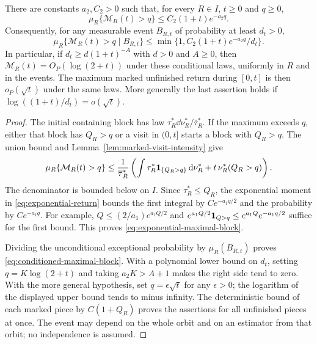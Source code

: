 \begin{theorem}
\label{thm:conditioned-maximal-block}
There are constants $a_2,C_2>0$ such that, for every $R\in I$, $t\ge0$
and $q\ge0$,
\begin{equation}\label{eq:exponential-maximal-block}
 \mu_R\{\mathcal M_R(t)>q\}\le C_2(1+t)e^{-a_2q}.
\end{equation}
Consequently, for any measurable event $B_{R,t}$ of probability at least
$d_t>0$,
\begin{equation}\label{eq:conditioned-maximal-block}
 \mu_R\{\mathcal M_R(t)>q\mid B_{R,t}\}
       \le\min\{1,C_2(1+t)e^{-a_2q}/d_t\}.
\end{equation}
In particular, if $d_t\ge d(1+t)^{-A}$ with $d>0$ and $A\ge0$, then
$\mathcal M_R(t)=O_P(\log(2+t))$ under these conditional laws, uniformly
in $R$ and in the events. The maximum marked unfinished return during
$[0,t]$ is then $o_P(\sqrt t)$ under the same laws. More generally the
last assertion holds if $\log((1+t)/d_t)=o(\sqrt t)$.
\end{theorem}
\begin{proof}
The initial containing block has law
$\tau_R^*\dd\nu_R^*/\overline\tau_R^*$. If the maximum exceeds $q$,
either that block has $Q_R>q$ or a visit in $(0,t]$ starts a block with
$Q_R>q$. The union bound and Lemma~\ref{lem:marked-visit-intensity} give
\begin{equation}\label{eq:exact-maximal-tail-budget}
 \mu_R\{\mathcal M_R(t)>q\}
 \le\frac1{\overline\tau_R^*}
       \left(\int\tau_R^*\one_{\{Q_R>q\}}\dd\nu_R^*
                       +t\,\nu_R^*(Q_R>q)\right).
\end{equation}
The denominator is bounded below on $I$. Since $\tau_R^*\le Q_R$,
the exponential moment in \eqref{eq:exponential-return} bounds the first
integral by $C e^{-a_1q/2}$ and the probability by $C e^{-a_1q}$.
For example, $Q\le (2/a_1)e^{a_1Q/2}$ and
$e^{a_1Q/2}\mathbf1_{Q>q}\le e^{a_1Q}e^{-a_1q/2}$ suffice for the
first bound. This proves \eqref{eq:exponential-maximal-block}.

Dividing the unconditional exceptional probability by $\mu_R(B_{R,t})$
proves \eqref{eq:conditioned-maximal-block}. With a polynomial lower
bound on $d_t$, setting $q=K\log(2+t)$ and taking
$a_2K>A+1$ makes the right side tend to zero. With the more general
hypothesis, set $q=\epsilon\sqrt t$ for any $\epsilon>0$; the logarithm
of the displayed upper bound tends to minus infinity. The deterministic
bound of each marked piece by $C(1+Q_R)$ proves the assertions for all
unfinished pieces at once. The event may depend on the whole orbit and
on an estimator from that orbit; no independence is assumed.
\end{proof}

